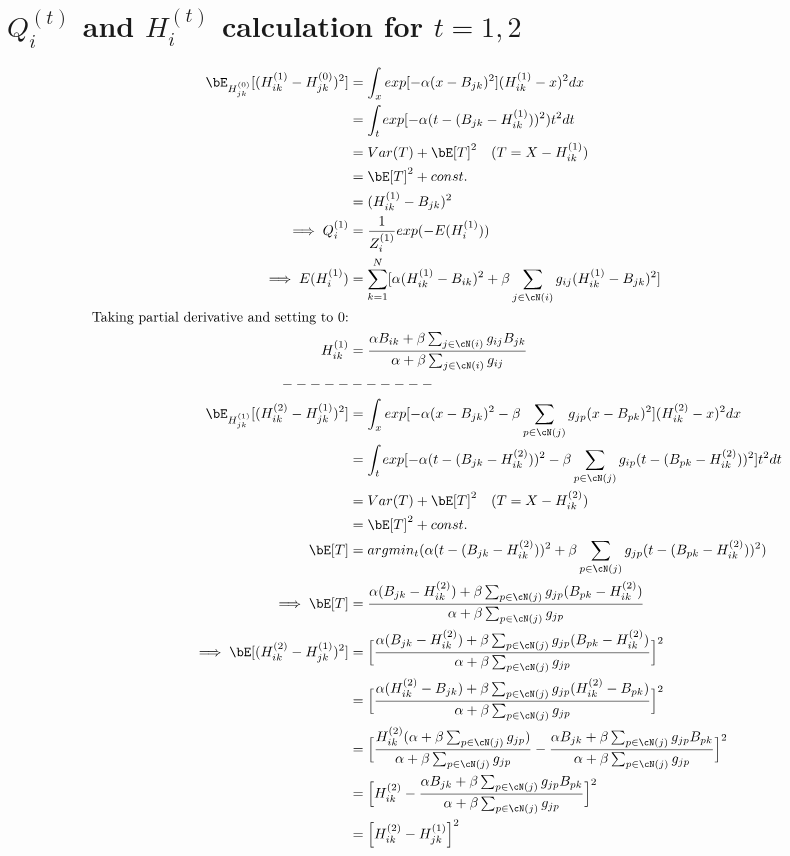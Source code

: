 \section*{$Q_i^{(t)}$ and $H_i^{(t)}$ calculation for $t=1,2$}
\begin{align*}
\bE_{H_{jk}^{(0)}}[(H_{ik}^{(1)} - H_{jk}^{(0)})^2] &= \int_{x} exp[-\alpha(x - B_{jk})^2 ](H_{ik}^{(1)}-x)^2dx\\
 &=\int_{t} exp[-\alpha(t - (B_{jk} - H_{ik}^{(1)}))^2)t^2dt\\
 &=Var(T) + \bE[T]^2  \hspace{10pt}\text{($T = X - H_{ik}^{(1)}$)}\\
 &= \bE[T]^2 + const.\\
 &= (H_{ik}^{(1)} - B_{jk})^2\\
 \implies Q_i^{(1)} &= \frac{1}{Z_{i}^{(1)}}exp(-E(H_i^{(1)}))\\
 \implies E(H_i^{(1)}) &= \sum_{k=1}^{N}[\alpha(H_{ik}^{(1)} - B_{ik})^2 + \beta\sum_{j\in\cN(i)}g_{ij}(H_{ik}^{(1)} - B_{jk})^2]\\
 \text{Taking partial derivative and setting to 0:}\\
 H_{ik}^{(1)} &= \frac{\alpha B_{ik} +  \beta\sum_{j\in\cN(i)}g_{ij}B_{jk}}{\alpha + \beta\sum_{j\in\cN(i)}g_{ij}}\\
 ----- & ------\\
 \bE_{H_{jk}^{(1)}}[(H_{ik}^{(2)} - H_{jk}^{(1)})^2] &= \int_{x} exp[-\alpha(x - B_{jk})^2 - \beta\sum_{p\in\cN(j)}g_{jp}(x - B_{pk})^2](H_{ik}^{(2)}-x)^2dx\\
        &=\int_{t} exp[-\alpha(t - (B_{jk} - H_{ik}^{(2)}))^2 - \beta\sum_{p\in\cN(j)}g_{ip}(t  - (B_{pk} -H_{ik}^{(2)}))^2]t^2dt\\
 &=Var(T) + \bE[T]^2  \hspace{10pt}\text{($T = X - H_{ik}^{(2)}$)}\\
 &= \bE[T]^2 + const.\\
\bE[T] &= argmin_{t} (\alpha(t - (B_{jk} - H_{ik}^{(2)}))^2 + \beta\sum_{p\in\cN(j)}g_{jp}(t  - (B_{pk} -H_{ik}^{(2)}))^2)\\
\implies \bE[T] &= \frac{\alpha(B_{jk} - H_{ik}^{(2)}) + \beta\sum_{p\in\cN(j)}g_{jp}(B_{pk} -H_{ik}^{(2)})}{\alpha + \beta\sum_{p\in\cN(j)}g_{jp}} \\
\implies \bE[(H_{ik}^{(2)} - H_{jk}^{(1)})^2] &= \Big{[}\frac{\alpha(B_{jk} - H_{ik}^{(2)}) + \beta\sum_{p\in\cN(j)}g_{jp}(B_{pk} -H_{ik}^{(2)})}{\alpha + \beta\sum_{p\in\cN(j)}g_{jp}}\Big{]}^2\\
&=\Big{[}\frac{\alpha(H_{ik}^{(2)} - B_{jk}) + \beta\sum_{p\in\cN(j)}g_{jp}(H_{ik}^{(2)} - B_{pk})}{\alpha + \beta\sum_{p\in\cN(j)}g_{jp}}\Big{]}^2\\
&= \Big{[}\frac{H_{ik}^{(2)}(\alpha + \beta\sum_{p\in\cN(j)}g_{jp})}{\alpha + \beta\sum_{p\in\cN(j)}g_{jp}} - \frac{\alpha B_{jk} +  \beta\sum_{p\in\cN(j)}g_{jp}B_{pk}}{\alpha + \beta\sum_{p\in\cN(j)}g_{jp}}\Big{]}^2\\
&= \Big{[}H_{ik}^{(2)} - \frac{\alpha B_{jk} +  \beta\sum_{p\in\cN(j)}g_{jp}B_{pk}}{\alpha + \beta\sum_{p   \in\cN(j)}g_{jp}}\Big{]}^2\\
&=\Big{[}H_{ik}^{(2)} - H_{jk}^{(1)}\Big{]}^2\\
\end{align*} 
